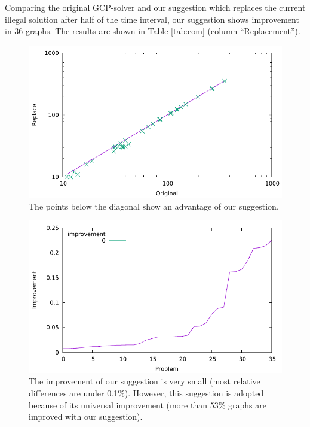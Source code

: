 \documentclass[12pt,a4paper,twoside]{scrartcl}
\numberwithin{equation}{section}
\begin{document}
Comparing the original GCP-solver and our suggestion which replaces the current illegal solution after half of the time interval, our suggestion shows improvement in 36 graphs. The results are shown in Table \ref{tab:com} (column ``Replacement''). 

\begin{figure}[h!]
\centering
  \includegraphics[scale = 1]{Experiments/E2/scalog.pdf}
  \caption{The points below the diagonal show an advantage of our suggestion.}
  \end{figure}
\begin{figure}[H]
\centering
  \includegraphics[scale = 1]{Experiments/E2/impro.pdf}
      \caption{The improvement of our suggestion is very small
       (most relative differences are under 0.1\%). However, this suggestion is adopted because of its universal improvement (more than 53\% graphs are improved with our suggestion).}
\end{figure}
\end{document}
